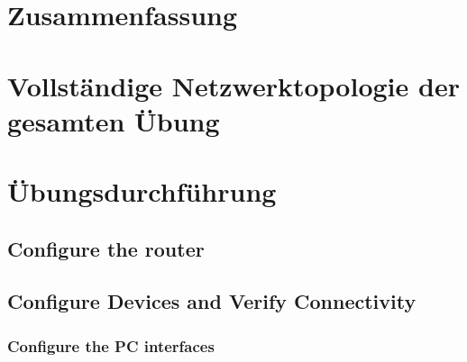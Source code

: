 \documentclass[a4paper]{article}
\begin{document}
\section{Zusammenfassung}

\newpage

\section{Vollständige Netzwerktopologie der gesamten Übung}

\newpage

\section{Übungsdurchführung}
\subsection{Configure the router}

\subsection{Configure Devices and Verify Connectivity}
\subsubsection{Configure the PC interfaces}
\end{document}
